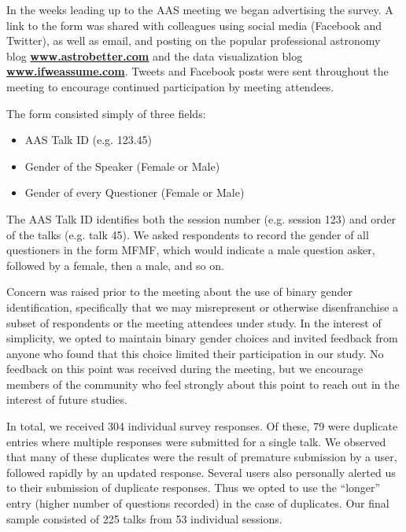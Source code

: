 \documentclass[iop]{emulateapj}
\begin{document}
In the weeks leading up to the AAS meeting we began advertising the survey. A link to the form was shared with colleagues using social media (Facebook and Twitter), as well as email, and posting on the popular professional astronomy blog \href{http://www.astrobetter.com}{\bf{www.astrobetter.com}} and the data visualization blog \href{http://www.ifweassume.com}{\bf{www.ifweassume.com}}. Tweets and Facebook posts were sent throughout the meeting to encourage continued participation by meeting attendees. 

The form consisted simply of three fields: 
\begin{itemize}
\item AAS Talk ID (e.g. 123.45)
\item Gender of the Speaker (Female or Male)
\item Gender of every Questioner (Female or Male)
\end{itemize}
The AAS Talk ID identifies both the session number (e.g. session 123) and order of the talks (e.g. talk 45). We asked respondents to record the gender of all questioners in the form MFMF, which would indicate a male question asker, followed by a female, then a male, and so on.

Concern was raised prior to the meeting about the use of binary gender identification, specifically that we may misrepresent or otherwise disenfranchise a subset of respondents or the meeting attendees under study.  In the interest of simplicity, we opted to maintain binary gender choices and invited feedback from anyone who found that this choice limited their participation in our study. No feedback on this point was received during the meeting, but we encourage members of the community who feel strongly about this point to reach out in the interest of future studies.

In total, we received 304 individual survey responses. Of these, 79 were duplicate entries where multiple responses were submitted for a single talk. We observed that many of these duplicates were the result of premature submission by a user, followed rapidly by an updated response. Several users also personally alerted us to their submission of duplicate responses. Thus we opted to use the ``longer'' entry (higher number of questions recorded) in the case of duplicates. Our final sample consisted of 225 talks from 53 individual sessions.



\end{document}
